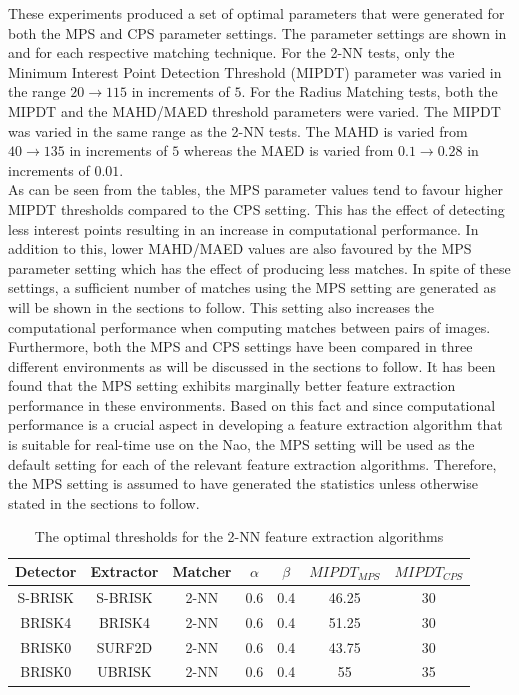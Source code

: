 \documentclass[11pt]{report}
\begin{document}
These experiments produced a set of optimal parameters that were generated for both the MPS and CPS parameter settings. The parameter settings are shown in  and  for each respective matching technique. For the 2-NN tests, only the Minimum Interest Point Detection Threshold (MIPDT) parameter was varied in the range $20 \rightarrow 115$ in increments of $5$. For the Radius Matching tests, both the MIPDT and the MAHD/MAED threshold parameters were varied. The MIPDT was varied in the same range as the 2-NN tests. The MAHD is varied from $40 \rightarrow 135$ in increments of $5$ whereas the MAED is varied from $0.1 \rightarrow 0.28$ in increments of $0.01$.\\

As can be seen from the tables, the MPS parameter values tend to favour higher MIPDT thresholds compared to the CPS setting. This has the effect of detecting less interest points resulting in an increase in computational performance. In addition to this, lower MAHD/MAED values are also favoured by the MPS parameter setting which has the effect of producing less matches. In spite of these settings, a sufficient number of matches using the MPS setting are generated as will be shown in the sections to follow. This setting also increases the computational performance when computing matches between pairs of images.\\

Furthermore, both the MPS and CPS settings have been compared in three different environments as will be discussed in the sections to follow. It has been found that the MPS setting exhibits marginally better feature extraction performance in these environments. Based on this fact and since computational performance is a crucial aspect in developing a feature extraction algorithm that is suitable for real-time use on the Nao, the MPS setting will be used as the default setting for each of the relevant feature extraction algorithms. Therefore, the MPS setting is assumed to have generated the statistics unless otherwise stated in the sections to follow.\\

\begin{table}
\centering
\caption{The optimal thresholds for the 2-NN feature extraction algorithms}
\footnotesize
\begin{tabular}{|c|c|c|c|c|c|c|}
\hline 
Detector & Extractor & Matcher & $\alpha$ & $\beta$ & $MIPDT_{MPS}$ & $MIPDT_{CPS}$\tabularnewline
\hline 
\hline 
S-BRISK & S-BRISK & 2-NN & 0.6 & 0.4 & 46.25 & 30\tabularnewline
\hline 
BRISK4 & BRISK4 & 2-NN & 0.6 & 0.4 & 51.25 & 30\tabularnewline
\hline 
BRISK0 & SURF2D & 2-NN & 0.6 & 0.4 & 43.75 & 30\tabularnewline
\hline 
BRISK0 & UBRISK & 2-NN & 0.6 & 0.4 & 55 & 35\tabularnewline
\hline 
\end{tabular}
\label{tab:knnStatistics}
\end{table}
\end{document}
